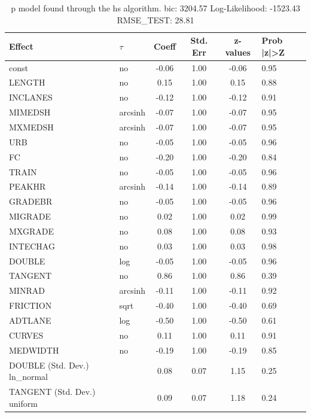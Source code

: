 \begin{table}
	\caption{p model found through the hs algorithm. bic: 3204.57 Log-Likelihood: -1523.43 RMSE_TEST: 28.81}
	\begin{center}
		\begin{tabular}{|l|l|c|c|c|l|}
			\hline
			Effect & $\tau$ & Coeff & Std. Err & z-values & Prob |z|>Z \\
			\hline
			const & no & -0.06 & 1.00 & -0.06 & 0.95 \\
			\hline
			LENGTH & no & 0.15 & 1.00 & 0.15 & 0.88 \\
			\hline
			INCLANES & no & -0.12 & 1.00 & -0.12 & 0.91 \\
			\hline
			MIMEDSH & arcsinh & -0.07 & 1.00 & -0.07 & 0.95 \\
			\hline
			MXMEDSH & arcsinh & -0.07 & 1.00 & -0.07 & 0.95 \\
			\hline
			URB & no & -0.05 & 1.00 & -0.05 & 0.96 \\
			\hline
			FC & no & -0.20 & 1.00 & -0.20 & 0.84 \\
			\hline
			TRAIN & no & -0.05 & 1.00 & -0.05 & 0.96 \\
			\hline
			PEAKHR & arcsinh & -0.14 & 1.00 & -0.14 & 0.89 \\
			\hline
			GRADEBR & no & -0.05 & 1.00 & -0.05 & 0.96 \\
			\hline
			MIGRADE & no & 0.02 & 1.00 & 0.02 & 0.99 \\
			\hline
			MXGRADE & no & 0.08 & 1.00 & 0.08 & 0.93 \\
			\hline
			INTECHAG & no & 0.03 & 1.00 & 0.03 & 0.98 \\
			\hline
			DOUBLE & log & -0.05 & 1.00 & -0.05 & 0.96 \\
			\hline
			TANGENT & no & 0.86 & 1.00 & 0.86 & 0.39 \\
			\hline
			MINRAD & arcsinh & -0.11 & 1.00 & -0.11 & 0.92 \\
			\hline
			FRICTION & sqrt & -0.40 & 1.00 & -0.40 & 0.69 \\
			\hline
			ADTLANE & log & -0.50 & 1.00 & -0.50 & 0.61 \\
			\hline
			CURVES & no & 0.11 & 1.00 & 0.11 & 0.91 \\
			\hline
			MEDWIDTH & no & -0.19 & 1.00 & -0.19 & 0.85 \\
			\hline
			DOUBLE (Std. Dev.) ln_normal &  & 0.08 & 0.07 & 1.15 & 0.25 \\
			\hline
			TANGENT (Std. Dev.) uniform &  & 0.09 & 0.07 & 1.18 & 0.24 \\

\end{tabular}
\end{center}
\end{table}
